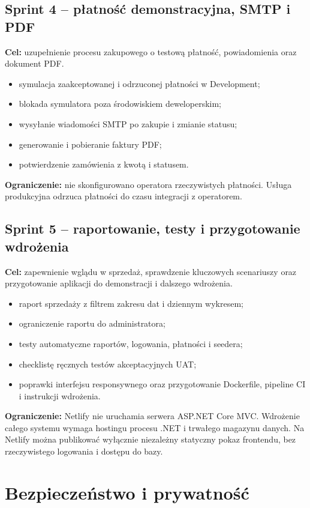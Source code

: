 \documentclass[12pt,a4paper]{article}
\begin{document}
\subsection{Sprint 4 -- płatność demonstracyjna, SMTP i PDF}
\textbf{Cel:} uzupełnienie procesu zakupowego o testową płatność, powiadomienia
oraz dokument PDF.
\begin{itemize}[leftmargin=*]
    \item symulacja zaakceptowanej i odrzuconej płatności w Development;
    \item blokada symulatora poza środowiskiem deweloperskim;
    \item wysyłanie wiadomości SMTP po zakupie i zmianie statusu;
    \item generowanie i pobieranie faktury PDF;
    \item potwierdzenie zamówienia z kwotą i statusem.
\end{itemize}
\textbf{Ograniczenie:} nie skonfigurowano operatora rzeczywistych płatności.
Usługa produkcyjna odrzuca płatności do czasu integracji z operatorem.

\subsection{Sprint 5 -- raportowanie, testy i przygotowanie wdrożenia}
\textbf{Cel:} zapewnienie wglądu w sprzedaż, sprawdzenie kluczowych scenariuszy
oraz przygotowanie aplikacji do demonstracji i dalszego wdrożenia.
\begin{itemize}[leftmargin=*]
    \item raport sprzedaży z filtrem zakresu dat i dziennym wykresem;
    \item ograniczenie raportu do administratora;
    \item testy automatyczne raportów, logowania, płatności i seedera;
    \item checklistę ręcznych testów akceptacyjnych UAT;
    \item poprawki interfejsu responsywnego oraz przygotowanie Dockerfile,
    pipeline CI i instrukcji wdrożenia.
\end{itemize}
\textbf{Ograniczenie:} Netlify nie uruchamia serwera ASP.NET Core MVC.
Wdrożenie całego systemu wymaga hostingu procesu .NET i trwałego magazynu
danych. Na Netlify można publikować wyłącznie niezależny statyczny pokaz
frontendu, bez rzeczywistego logowania i dostępu do bazy.

\section{Bezpieczeństwo i prywatność}
\end{document}
